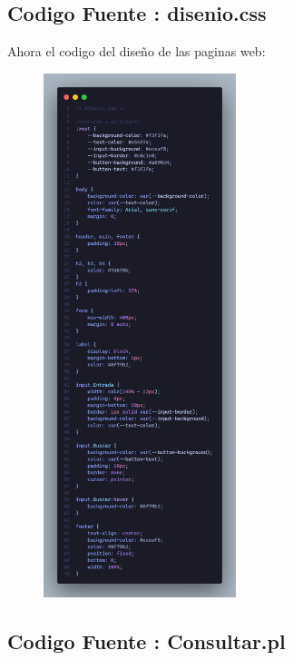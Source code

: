 \subsection{Codigo Fuente : disenio.css}
Ahora el codigo del diseño de las paginas web: 
\begin{figure}[h!]
    \centering
    \includegraphics[width=0.5\textwidth,keepaspectratio]{img/disenio_css.png}
\end{figure}
\clearpage

\subsection{Codigo Fuente : Consultar.pl}

